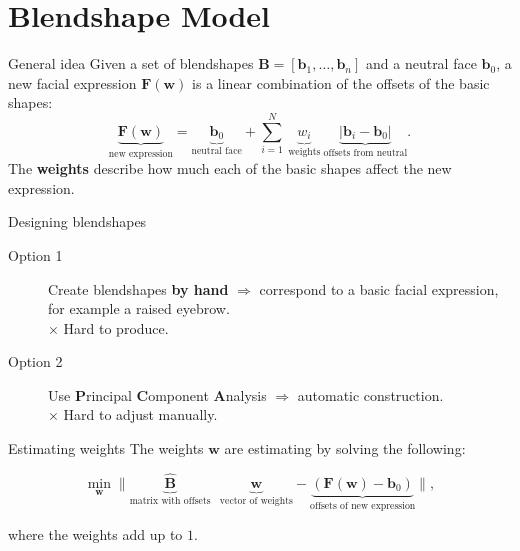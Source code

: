 \documentclass{beamer}
\newcommand{\w}{\mathbf{w}}
\newcommand{\F}{\mathbf{F}}
\newcommand{\bb}{\mathbf{b}}
\begin{document}
\section{Blendshape Model}
\begin{frame}{General idea}
Given a set of blendshapes $\mathbf{B} = [\bb_1, \ldots, \bb_n]$ and a neutral face $\bb_0$, a new facial expression $\mathbf{F(\w)}$ is a linear combination of the offsets of the basic shapes:
\begin{equation*}
	\underbrace{\F(\w)}_{\text{new expression}} = \underbrace{ \bb_0 }_{\text{neutral face}}+ \sum_{i=1}^N \: \underbrace{w_i}_{\text{weights}} \: \underbrace{|\bb_i - \bb_0|}_{\text{offsets from neutral}}.
\end{equation*}
The \textbf{weights} describe how much each of the basic shapes affect the new expression. 
\end{frame}


\begin{frame}{Designing blendshapes}
\begin{description}
	\item[Option 1] Create blendshapes \textbf{by hand} $\Rightarrow$ correspond to a basic facial expression, for example a raised eyebrow.\\
					$\times$  Hard to produce. \vspace{0.5 cm}
	\item[Option 2] Use \textbf{P}rincipal \textbf{C}omponent \textbf{A}nalysis $\Rightarrow$ automatic construction. \\
					$\times$  Hard to adjust manually.
\end{description}

\end{frame}


\begin{frame}{Estimating weights}
The weights $\w$ are estimating by solving the following:


\begin{minipage}[t]{0.95\linewidth} 
\begin{tcolorbox}[colback=gray!5,colframe=jvagreen, title=Minimisation problem]
\begin{equation*}
	\min_\w \| \underbrace{\hat{\mathbf{B}}}_{\text{matrix with offsets}} \: \: \: \underbrace{\w}_{\text{vector of weights}} - \underbrace{(\F(\w) - \bb_0)}_{\text{offsets of new expression}} \|,
\end{equation*}        
\end{tcolorbox} 
\end{minipage}  \vspace{0.5 cm}

where the weights add up to $1$.

\end{frame}
\end{document}
